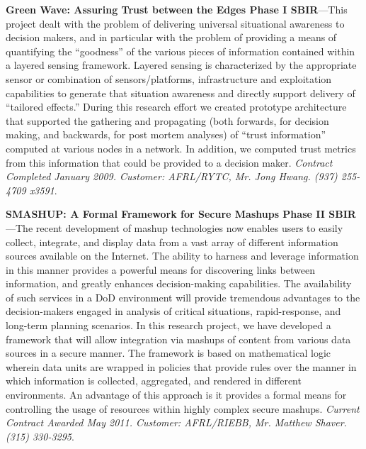\documentclass{sbir}
\begin{document}
{\bf Green Wave: Assuring Trust between the Edges Phase I SBIR}---This project dealt with the problem of delivering universal situational awareness to decision makers, and in particular with the problem of providing a means of quantifying the ``goodness'' of the various pieces of information contained within a layered sensing framework. Layered sensing is characterized by the appropriate sensor or combination of sensors/platforms, infrastructure and exploitation capabilities to generate that situation awareness and directly support delivery of ``tailored effects.'' During this research effort we created prototype architecture that supported the gathering and propagating (both forwards, for decision making, and backwards, for post mortem analyses) of ``trust information'' computed at various nodes in a network. In addition, we computed trust metrics from this information that could be provided to a decision maker. \emph{Contract Completed January 2009. Customer: AFRL/RYTC, Mr. Jong Hwang. (937) 255-4709 x3591}.

{\bf SMASHUP: A Formal Framework for Secure Mashups Phase II SBIR}---The recent development of mashup technologies now enables users to easily collect, integrate, and display data from a vast array of different information sources available on the Internet. The ability to harness and leverage information in this manner provides a powerful means for discovering links between information, and greatly enhances decision-making capabilities. The availability of such services in a DoD environment will provide tremendous advantages to the decision-makers engaged in analysis of critical situations, rapid-response, and long-term planning scenarios. In this research project, we have developed a framework that will allow integration via mashups of content from various data sources in a secure manner. The framework is based on mathematical logic wherein data units are wrapped in policies that provide rules over the manner in which information is collected, aggregated, and rendered in different environments. An advantage of this approach is it provides a formal means for controlling the usage of resources within highly complex secure mashups. \emph{Current Contract Awarded May 2011. Customer: AFRL/RIEBB, Mr. Matthew Shaver. (315) 330-3295}.
\end{document}

